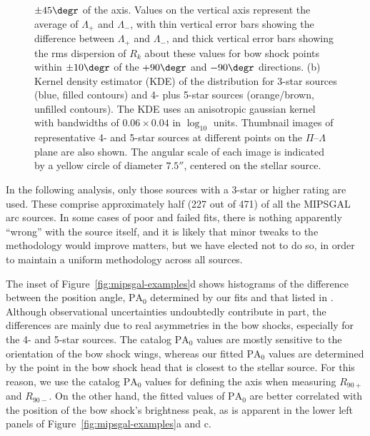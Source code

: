 \documentclass[useAMS, usenatbib, a4paper]{mnras}
\begin{document}
\begin{figure}
{    \(\pm 45\degr\) of the axis.  Values on the vertical axis
    represent the average of \(\Lambda_{+}\) and \(\Lambda_{-}\), with thin
    vertical error bars showing the difference between \(\Lambda_{+}\) and
    \(\Lambda_{-}\), and thick vertical error bars showing the rms
    dispersion of \(R_k\) about these values for bow shock points
    within \(\pm 10\degr\) of the \(+90\degr\) and \(-90\degr\)
    directions.  (b) Kernel density estimator (KDE) of the
    distribution for 3-star sources (blue, filled contours) and 4-
    plus 5-star sources (orange/brown, unfilled contours).  The KDE
    uses an anisotropic gaussian kernel with bandwidths of
    \(0.06 \times 0.04\) in \(\log_{10}\) units. Thumbnail images of
    representative 4- and 5-star sources at different points on the
    \(\Pi\)--\(\Lambda\) plane are also shown. The angular scale of each image
    is indicated by a yellow circle of diameter \(7.5''\), centered on
    the stellar source.}
  \label{fig:mipsgal-shapes}
\end{figure}

In the following analysis, only those sources with a 3-star or higher
rating are used.  These comprise approximately half (227 out of 471)
of all the MIPSGAL arc sources.  In some cases of poor and failed
fits, there is nothing apparently ``wrong'' with the source itself,
and it is likely that minor tweaks to the methodology would improve
matters, but we have elected not to do so, in order to maintain a
uniform methodology across all sources.

The inset of Figure~\ref{fig:mipsgal-examples}d shows histograms of
the difference between the position angle, \(\text{PA}_0\) determined
by our fits and that listed in \citet{Kobulnicky:2016a}.  Although
observational uncertainties undoubtedly contribute in part, the
differences are mainly due to real asymmetries in the bow shocks,
especially for the 4- and 5-star sources.  The
\citeauthor{Kobulnicky:2016a} catalog \(\text{PA}_0\) values are
mostly sensitive to the orientation of the bow shock wings, whereas
our fitted \(\text{PA}_0\) values are determined by the point in the
bow shock head that is closest to the stellar source.  For this
reason, we use the catalog \(\text{PA}_0\) values for defining the
axis when measuring \(R_{90+}\) and \(R_{90-}\). On the other hand,
the fitted values of \(\text{PA}_0\) are better correlated with the
position of the bow shock's brightness peak, as is apparent in the
lower left panels of Figure~\ref{fig:mipsgal-examples}a and c.
\end{document}
